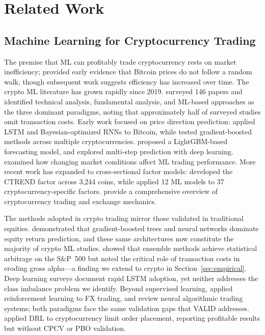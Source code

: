 \documentclass[preprint,12pt,authoryear]{elsarticle}
\begin{document}
\section{Related Work}
\label{sec:related}

\subsection{Machine Learning for Cryptocurrency Trading}

The premise that ML can profitably trade cryptocurrency rests on market inefficiency; \citet{urquhart2016inefficiency} provided early evidence that Bitcoin prices do not follow a random walk, though subsequent work suggests efficiency has increased over time. The crypto ML literature has grown rapidly since 2019. \citet{fang2022cryptocurrency} surveyed 146 papers and identified technical analysis, fundamental analysis, and ML-based approaches as the three dominant paradigms, noting that approximately half of surveyed studies omit transaction costs. Early work focused on price direction prediction: \citet{mcnally2018predicting} applied LSTM and Bayesian-optimized RNNs to Bitcoin, while \citet{alessandretti2018anticipating} tested gradient-boosted methods across multiple cryptocurrencies. \citet{sun2020novel} proposed a LightGBM-based forecasting model, and \citet{vo2020towards} explored multi-step prediction with deep learning. \citet{sebastiao2021forecasting} examined how changing market conditions affect ML trading performance. More recent work has expanded to cross-sectional factor models: \citet{fieberg2025ctrend} developed the CTREND factor across 3,244 coins, while \citet{cakici2024machine} applied 12 ML models to 37 cryptocurrency-specific factors. \citet{leung2021cryptocurrency} provide a comprehensive overview of cryptocurrency trading and exchange mechanics.

The methods adopted in crypto trading mirror those validated in traditional equities. \citet{gu2020empirical} demonstrated that gradient-boosted trees and neural networks dominate equity return prediction, and these same architectures now constitute the majority of crypto ML studies. \citet{krauss2017deep} showed that ensemble methods achieve statistical arbitrage on the S\&P~500 but noted the critical role of transaction costs in eroding gross alpha---a finding we extend to crypto in Section~\ref{sec:empirical}. Deep learning surveys \citep{olorunnimbe2023deep,siaminamini2019performance,jiang2024survey} document rapid LSTM adoption, yet neither addresses the class imbalance problem we identify. Beyond supervised learning, \citet{borrageiro2022reinforcement} applied reinforcement learning to FX trading, and \citet{zhang2025neural} review neural algorithmic trading systems; both paradigms face the same validation gaps that VALID addresses. \citet{schnaubelt2022deep} applied DRL to cryptocurrency limit order placement, reporting profitable results but without CPCV or PBO validation.
\end{document}

